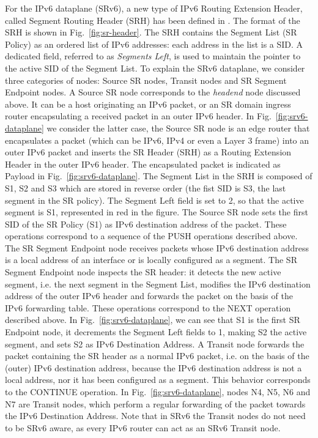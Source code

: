 For the IPv6 dataplane (SRv6), a new type of IPv6 Routing Extension Header, called Segment Routing Header (SRH) has been defined in \cite{ietf-6man-segment-routing-header}. The format of the SRH is shown in Fig.~\ref{fig:sr-header}. The SRH contains the Segment List (SR Policy) as an ordered list of IPv6 addresses: each address in the list is a SID. A dedicated field, referred to as \textit{Segments Left}, is used to maintain the pointer to the active SID of the Segment List. To explain the SRv6 dataplane, we consider three categories of nodes: Source SR nodes, Transit nodes and SR Segment Endpoint nodes. A Source SR node corresponds to the \textit{headend} node discussed above. It can be a host originating an IPv6 packet, or an SR domain ingress router encapsulating a received packet in an outer IPv6 header. In Fig.~\ref{fig:srv6-dataplane} we consider the latter case, the Source SR node is an edge router that encapsulates a packet (which can be IPv6, IPv4 or even a Layer 3 frame) into an outer IPv6 packet and inserts the SR Header (SRH) as a Routing Extension Header in the outer IPv6 header. The encapsulated packet is indicated as Payload in Fig.~\ref{fig:srv6-dataplane}. The Segment List in the SRH is composed of S1, S2 and S3 which are stored in reverse order (the fist SID is S3, the last segment in the SR policy). The Segment Left field is set to 2, so that the active segment is S1, represented in red in the figure. The Source SR node sets the first SID of the SR Policy (S1) as IPv6 destination address of the packet. These operations correspond to a sequence of the PUSH operations described above. The SR Segment Endpoint node receives packets whose IPv6 destination address is a local address of an interface or is locally configured as a segment. The SR Segment Endpoint node inspects the SR header: it detects the new active segment, i.e. the next segment in the Segment List, modifies the IPv6 destination address of the outer IPv6 header and forwards the packet on the basis of the IPv6 forwarding table. These operations correspond to the NEXT operation described above. In Fig.~\ref{fig:srv6-dataplane}, we can see that S1 is the first SR Endpoint node, it decrements the Segment Left fields to 1, making S2 the active segment, and sets S2 as IPv6 Destination Address. A Transit node forwards the packet containing the SR header as a normal IPv6 packet, i.e. on the basis of the (outer) IPv6 destination address, because the IPv6 destination address is not a local address, nor it has been configured as a segment. This behavior corresponds to the CONTINUE operation. In Fig.~\ref{fig:srv6-dataplane}, nodes N4, N5, N6 and N7 are Transit nodes, which perform a regular forwarding of the packet towards the IPv6 Destination Address. Note that in SRv6 the Transit nodes do not need to be SRv6 aware, as every IPv6 router can act as an SRv6 Transit node. 

